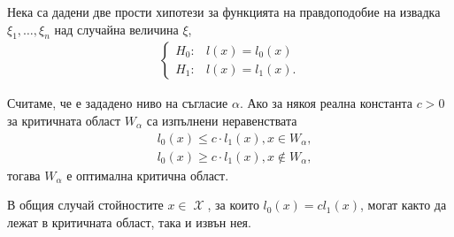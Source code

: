 \documentclass{../../common/topic}
\begin{document}
\begin{lemma}
  Нека са дадени две прости хипотези за функцията на правдоподобие на извадка \( \xi_1, \ldots, \xi_n \) над случайна величина \( \xi \),
  \begin{align*}
    \begin{cases}
      H_0: &l(x) = l_0(x) \\
      H_1: &l(x) = l_1(x).
    \end{cases}
  \end{align*}

  Считаме, че е зададено ниво на съгласие \( \alpha \). Ако за някоя реална константа \( c > 0 \) за критичната област \( W_\alpha \) са изпълнени неравенствата
  \begin{align*}
    &l_0(x) \leq c \cdot l_1(x), x \in W_\alpha, \\
    &l_0(x) \geq c \cdot l_1(x), x \not\in W_\alpha,
  \end{align*}
  тогава \( W_\alpha \) е оптимална критична област.
\end{lemma}

\begin{remark}
  В общия случай стойностите \( x \in \mscrX \), за които \( l_0(x) = cl_1(x) \), могат както да лежат в критичната област, така и извън нея.
\end{remark}
\end{document}
